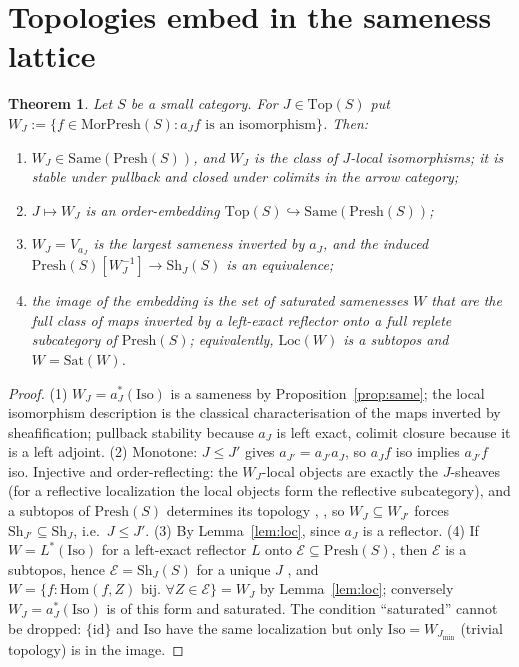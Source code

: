 \documentclass[11pt]{amsart}
\newtheorem{thm}{Theorem}[section]
\theoremstyle{definition}
\newcommand{\Same}{\mathrm{Same}}
\newcommand{\Top}{\mathrm{Top}}
\newcommand{\Mor}{\mathrm{Mor}}
\newcommand{\Iso}{\mathrm{Iso}}
\newcommand{\Presh}{\mathrm{Presh}}
\newcommand{\Sh}{\mathrm{Sh}}
\begin{document}
\section{Topologies embed in the sameness lattice}\label{sec:embed}

\begin{thm}\label{thm:embed}
Let $S$ be a small category. For $J\in\Top(S)$ put
$W_J:=\{f\in\Mor\Presh(S): a_J f\text{ is an isomorphism}\}$. Then:
\begin{enumerate}
\item $W_J\in\Same(\Presh(S))$, and $W_J$ is the class of $J$-local
isomorphisms; it is stable under pullback and closed under colimits in the
arrow category;
\item $J\mapsto W_J$ is an order-embedding $\Top(S)\hookrightarrow
\Same(\Presh(S))$;
\item $W_J=V_{a_J}$ is the largest sameness inverted by $a_J$, and the induced
$\Presh(S)[W_J^{-1}]\to\Sh_J(S)$ is an equivalence;
\item the image of the embedding is the set of saturated samenesses $W$
that are the full class of maps inverted by a left-exact reflector onto a
full replete subcategory of $\Presh(S)$; equivalently, $\mathrm{Loc}(W)$ is a
subtopos and $W=\mathrm{Sat}(W)$.
\end{enumerate}
\end{thm}
\begin{proof}
(1) $W_J=a_J^*(\Iso)$ is a sameness by Proposition~\ref{prop:same}; the local
isomorphism description is the classical characterisation of the maps
inverted by sheafification; pullback stability because $a_J$ is left exact,
colimit closure because it is a left adjoint. (2) Monotone: $J\le J'$ gives
$a_{J'}=a_{J'}a_J$, so $a_Jf$ iso implies $a_{J'}f$ iso. Injective and
order-reflecting: the $W_J$-local objects are exactly the $J$-sheaves (for a
reflective localization the local objects form the reflective subcategory),
and a subtopos of $\Presh(S)$ determines its topology \cite[V.4]{MLM}, \cite[A4.3]{Elephant}, so $W_J\subseteq
W_{J'}$ forces $\Sh_{J'}\subseteq\Sh_J$, i.e.\ $J\le J'$. (3) By
Lemma~\ref{lem:loc}, since $a_J$ is a reflector. (4) If $W=L^*(\Iso)$ for a
left-exact reflector $L$ onto $\mathcal E\subseteq\Presh(S)$, then
$\mathcal E$ is a subtopos, hence $\mathcal E=\Sh_J(S)$ for a unique $J$
\cite[A4.3]{Elephant}, and $W=\{f:\mathrm{Hom}(f,Z)\text{ bij.\ }\forall
Z\in\mathcal E\}=W_J$ by Lemma~\ref{lem:loc}; conversely $W_J=a_J^*(\Iso)$ is
of this form and saturated. The condition ``saturated'' cannot be dropped:
$\{\mathrm{id}\}$ and $\Iso$ have the same localization but only $\Iso=W_{J_{\min}}$
(trivial topology) is in the image.
\end{proof}
\end{document}
